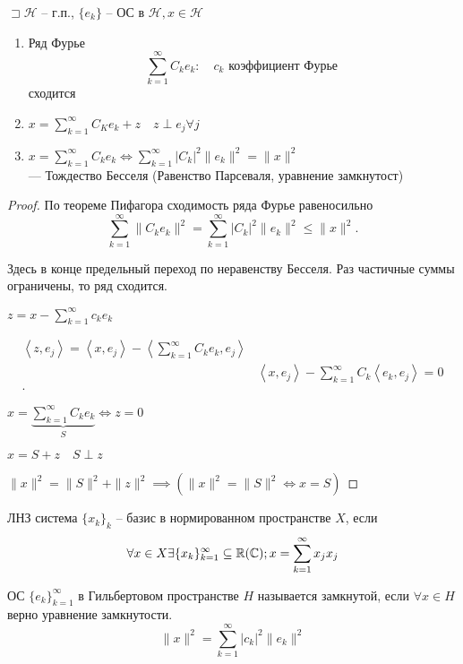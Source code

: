 \begin{theorem}

    $\sqsupset \mathcal{H}$ -- г.п., $\{e_k\}$ -- ОС в $\mathcal{H}, x\in \mathcal{H}$

    \begin{enumerate}
        \item Ряд Фурье \[\sum_{k=1}^{\infty } C_ke_k:\quad c_k \text{ коэффициент Фурье }\]
        сходится
        \item $x = \sum_{k=1}^{\infty } C_K e_k + z\quad z\perp e_j \forall j $
        \item $x = \sum_{k=1}^{\infty } C_k e_k \iff \sum_{k=1}^{\infty } |C_k|^2 \|e_k\|^2 = \|x\|^2 $\\--- Тождество Бесселя (Равенство Парсеваля, уравнение замкнутост)
    \end{enumerate}
\end{theorem}
\begin{proof}
    По теореме Пифагора сходимость ряда Фурье равеносильно
    \[ \sum_{k=1}^{\infty } \|C_k e_k\|^2 = \sum_{k=1}^{\infty } |C_k|^2 \|e_k\|^2 \leqslant \|x\|^2. \]

    Здесь в конце предельный переход по неравенству Бесселя. Раз частичные суммы ограничены, то ряд сходится.

    $z = x - \sum_{k=1}^{\infty }c_ke_k $

    \begin{align*}
        \left<z, e_j \right> = \left<x, e_j \right> - \left<\sum_{k=1}^{\infty } C_ke_k, e_j  \right>\\
        &\left<x, e_j \right> - \sum_{k=1}^{\infty } C_k\left<e_k, e_j  \right> = 0 \\
    .\end{align*}

    $x = \underbrace{\sum_{k=1}^{\infty }C_ke_k}_S \iff z = 0 $

    $x = S + z\quad S\perp z$

    $\|x\|^2 = \|S\|^2 + \|z\|^2 \implies \left( \|x\|^2 = \|S\|^2 \iff x = S \right) $
\end{proof}

\begin{definition}
    ЛНЗ система $\{x_k\}_k$ -- базис в нормированном пространстве $X$, если
    \[\forall x\in X \exists \{x_k\}_{k=1}^{\infty } \subseteq \R(\C); x = \sum_{k=1}^{\infty } x_j x_j \]
\end{definition}

\begin{definition}
    ОС $\{e_k\}_{k=1}^{\infty }$  в Гильбертовом пространстве $H$ называется замкнутой, если $\forall x\in H$ верно уравнение замкнутости.
    \[\|x\|^2 = \sum_{k=1}^{\infty } |c_k|^2 \|e_k\|^2 \]
\end{definition}

